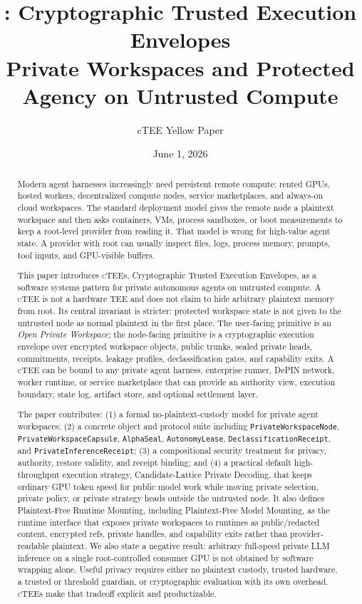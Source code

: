 \documentclass[11pt]{article}
\title{\ctee{}: Cryptographic Trusted Execution Envelopes\\[0.35em]
\large Private Workspaces and Protected Agency on Untrusted Compute}
\author{cTEE Yellow Paper}
\date{June 1, 2026}
\newcommand{\ctee}{\textnormal{\textsc{cTEE}}}
\newcommand{\code}[1]{\texttt{#1}}
\newcommand{\term}[1]{\textit{#1}}
\begin{document}
\maketitle

\begin{abstract}
Modern agent harnesses increasingly need persistent remote compute: rented GPUs,
hosted workers, decentralized compute nodes, service marketplaces, and
always-on cloud workspaces. The standard deployment model gives the remote node
a plaintext workspace and then asks containers, VMs, process sandboxes, or boot
measurements to keep a root-level provider from reading it. That model is
wrong for high-value agent state. A provider with root can usually inspect
files, logs, process memory, prompts, tool inputs, and GPU-visible buffers.

This paper introduces \ctee{}s, Cryptographic Trusted Execution Envelopes, as a
software systems pattern for private autonomous agents on untrusted compute.
A \ctee{} is not a hardware TEE and does not claim to hide arbitrary plaintext
memory from root. Its central invariant is stricter: protected workspace state
is not given to the untrusted node as normal plaintext in the first place.
The user-facing primitive is an \term{Open Private Workspace}; the node-facing
primitive is a cryptographic execution envelope over encrypted workspace
objects, public trunks, sealed private heads, commitments, receipts, leakage
profiles, declassification gates, and capability exits.
A \ctee{} can be bound to any private agent harness, enterprise runner,
DePIN network, worker runtime, or service marketplace that can provide an
authority view, execution boundary, state log, artifact store, and optional
settlement layer.

The paper contributes: (1) a formal no-plaintext-custody model for private
agent workspaces; (2) a concrete object and protocol suite including
\code{PrivateWorkspaceNode}, \code{PrivateWorkspaceCapsule}, \code{AlphaSeal},
\code{AutonomyLease}, \code{DeclassificationReceipt}, and
\code{PrivateInferenceReceipt}; (3) a compositional security treatment for
privacy, authority, restore validity, and receipt binding; and (4) a practical
default high-throughput execution strategy, Candidate-Lattice Private Decoding,
that keeps ordinary GPU token speed for public model work while moving private
selection, private policy, or private strategy heads outside the untrusted
node. It also defines Plaintext-Free Runtime Mounting, including
Plaintext-Free Model Mounting, as the runtime interface that exposes private
workspaces to runtimes as public/redacted content, encrypted refs, private
handles, and capability exits rather than provider-readable plaintext.
We also state a negative result: arbitrary full-speed private LLM
inference on a single root-controlled consumer GPU is not obtained by software
wrapping alone. Useful privacy requires either no plaintext custody, trusted
hardware, a trusted or threshold guardian, or cryptographic evaluation with its
own overhead. \ctee{}s make that tradeoff explicit and productizable.
\end{abstract}
\end{document}
